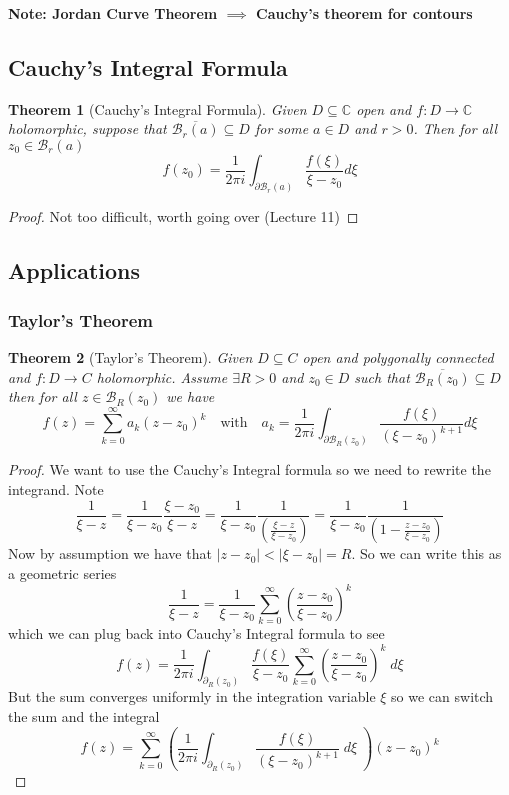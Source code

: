 \documentclass[11pt]{article}
\newcommand{\abs}[1]{\left|#1\right|}
\newcommand{\C}{\mathbb{C}}
\newenvironment{note}
	{\begin{mdframed}[backgroundcolor=white, linecolor=red, roundcorner=5pt, linewidth=1pt]\bfseries{Note:}\normalfont}
	{\end{mdframed}}
\newtheorem{theorem}{Theorem}[section]
\begin{document}
\begin{note}
Jordan Curve Theorem $\implies$ Cauchy's theorem for contours
\end{note}

\subsection{Cauchy's Integral Formula}
\begin{theorem}[Cauchy's Integral Formula]
Given $D\subseteq \C$ open and $f:D\to\C$ holomorphic, suppose that $\overline{\mathcal{B}_r(a)}\subseteq D$ for some $a\in D$ and $r>0$.
Then for all $z_0\in\mathcal{B}_r(a)$
\[
	f(z_0)=\frac{1}{2\pi i}\int_{\partial\mathcal{B}_r(a)}\frac{f(\xi)}{\xi-z_0}d\xi
\]
\end{theorem}

\begin{proof}
Not too difficult, worth going over (Lecture 11)
\end{proof}

\subsection{Applications}

\subsubsection{Taylor's Theorem}

\begin{theorem}[Taylor's Theorem]
Given $D\subseteq C$ open and polygonally connected and $f:D\to C$ holomorphic.
Assume $\exists R>0$ and $z_0\in D$ such that $\overline{\mathcal{B}_R(z_0)}\subseteq D$ then for all $z\in\mathcal{B}_R(z_0)$ we have
\[
	f(z)=\sum_{k=0}^{\infty}a_k(z-z_0)^k\quad\text{with}\quad a_k=\frac{1}{2\pi i}\int_{\partial \mathcal{B}_R(z_0)} \frac{f(\xi)}{(\xi - z_0)^{k+1}}d\xi
\]
\end{theorem}

\begin{proof}
We want to use the Cauchy's Integral formula so we need to rewrite the integrand.
Note
\[
	\frac{1}{\xi - z}= \frac{1}{\xi - z_0}\frac{\xi - z_0}{\xi - z}=\frac{1}{\xi - z_0}\frac{1}{\left( \frac{\xi - z}{\xi-z_0}\right)} = 
	\frac{1}{\xi - z_0}\frac{1}{\left( 1-\frac{z-z_0}{\xi -z_0}\right)}
\]
Now by assumption we have that $\abs{z- z_0} < \abs{\xi - z_0} = R$.
So we can write this as a geometric series
\[
	\frac{1}{\xi - z} = \frac{1}{\xi - z_0}\sum_{k=0}^{\infty}\left( \frac{z-z_0}{\xi - z_0}\right)^k
\]
which we can plug back into Cauchy's Integral formula to see
\[
	f(z) = \frac{1}{2\pi i}\int_{\partial_R(z_0)} \frac{f(\xi)}{\xi - z_0}\sum_{k=0}^{\infty}\left( \frac{z-z_0}{\xi - z_0}\right)^k\;d\xi
\]
But the sum converges uniformly in the integration variable $\xi$ so we can switch the sum and the integral
\[
	f(z) = \sum_{k=0}^\infty\left(\frac{1}{2\pi i}\int_{\partial_R(z_0)} \frac{f(\xi)}{(\xi - z_0)^{k+1}}\; d\xi \; \right)(z-z_0)^k
\]
\end{proof}
\end{document}
